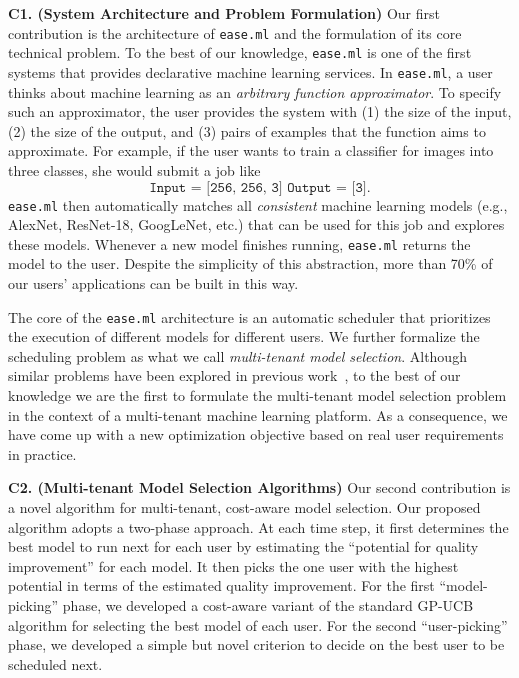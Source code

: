\documentclass[letterpaper]{vldb}
\newcommand{\eml}{\texttt{ease.ml}\xspace}
\begin{document}
\noindent
{\bf C1. (System Architecture and Problem Formulation)}
Our first contribution is the architecture of \eml and the formulation of its core technical problem.
To the best of our knowledge, \eml is one of the first systems that provides declarative machine learning services.
In \eml, a user thinks about machine learning as an {\em arbitrary function approximator}.
To specify such an approximator, the user provides the
system with (1) the size of the input, (2) the size of the output,
and (3) pairs of examples that the function aims to approximate.
For example, if the user wants to train a classifier
for images into three classes, she would submit a job like
\vspace{-0.5em}
\[
\texttt{Input = [256, 256, 3]
        Output = [3]}.
\]
\eml then automatically matches all {\em consistent} machine learning models (e.g., AlexNet, ResNet-18, GoogLeNet, etc.) 
that can be used for this job and explores these models.
Whenever a new model finishes running, \eml returns the model to the user.
Despite the simplicity of this abstraction, more than 70\% of
our users' applications can be built in this way.



The core of the \eml architecture is an automatic scheduler that prioritizes the execution of different models for different users.
We further formalize the scheduling problem as what we call {\em multi-tenant model selection}.
Although similar problems have been explored in previous work~\cite{XXX}, to the best of our knowledge we are the first to formulate the multi-tenant model selection problem in the context of a multi-tenant machine learning platform.
As a consequence, we have come up with a new optimization objective based on real user requirements in practice.


\noindent
{\bf C2. (Multi-tenant Model Selection Algorithms)} Our second contribution
is a novel algorithm for 
multi-tenant, cost-aware model selection.
Our proposed algorithm adopts a two-phase approach.
At each time step, it first determines the 
best model to run next for each user by
estimating the ``potential for quality improvement'' for each model.
It then picks the one user with the highest potential in terms of the estimated quality improvement.
For the first ``model-picking'' phase, we developed a cost-aware variant of the 
standard GP-UCB algorithm for selecting the best model of 
each user. For the second ``user-picking'' phase, we developed a simple but novel criterion to decide on the best user to be scheduled next.
\end{document}
